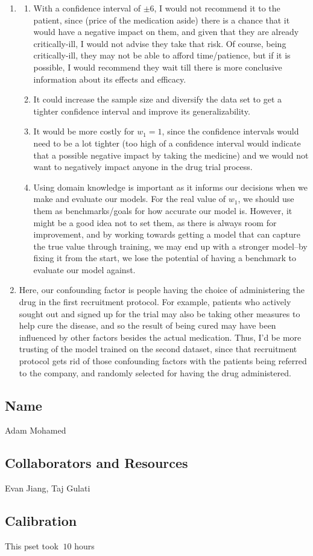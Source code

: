 \documentclass[submit]{harvardml}
\begin{document}
\begin{enumerate}
\item 
\begin{enumerate}
    \item With a confidence interval of $\pm 6$, I would not recommend it to the patient, since (price of the medication aside) there is a chance that it would have a negative impact on them, and given that they are already critically-ill, I would not advise they take that risk. Of course, being critically-ill, they may not be able to afford time/patience, but if it is possible, I would recommend they wait till there is more conclusive information about its effects and efficacy.

    \item It could increase the sample size and diversify the data set to get a tighter confidence interval and improve its generalizability.

    \item It would be more costly for $w_1 = 1$, since the confidence intervals would need to be a lot tighter (too high of a confidence interval would indicate that a possible negative impact by taking the medicine) and we would not want to negatively impact anyone in the drug trial process.

    \item Using domain knowledge is important as it informs our decisions when we make and evaluate our models. For the real value of $w_1$, we should use them as benchmarks/goals for how accurate our model is. However, it might be a good idea not to set them, as there is always room for improvement, and by working towards getting a model that can capture the true value through training, we may end up with a stronger model–by fixing it from the start, we lose the potential of having a benchmark to evaluate our model against.
\end{enumerate}

\item
Here, our confounding factor is people having the choice of administering the drug in the first recruitment protocol. For example, patients who actively sought out and signed up for the trial may also be taking other measures to help cure the disease, and so the result of being cured may have been influenced by other factors besides the actual medication. Thus, I'd be more trusting of the model trained on the second dataset, since that recruitment protocol gets rid of those confounding factors with the patients being referred to the company, and randomly selected for having the drug administered.

\end{enumerate}


\newpage
\subsection*{Name}
Adam Mohamed

\subsection*{Collaborators and Resources}
Evan Jiang, Taj Gulati

\subsection*{Calibration}
This pset took $~10$ hours
\end{document}
